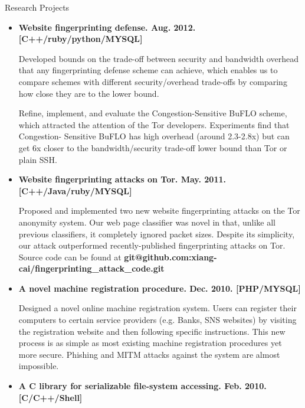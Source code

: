 \documentclass[11pt,oneside]{article}
\newenvironment{ressection}[1]{
	\vspace{4pt}
	{\fontfamily{phv}\selectfont\Large#1}
	\begin{itemize}
	\vspace{3pt}
}{
	\end{itemize}
}
\newcommand{\resitem}[1]{
	\vspace{-4pt}
	\item \begin{flushleft} #1 \end{flushleft}
}
\begin{document}
\begin{ressection}{Research Projects}

	\resitem{\textbf{Website fingerprinting defense. Aug.
		2012. [C++/ruby/python/MYSQL]} 
		\begin{small}
		
		Developed bounds on the trade-off between security and
		bandwidth overhead that any fingerprinting defense scheme can
		achieve, which enables us to compare schemes with different
		security/overhead trade-offs by comparing how close they are
		to the lower bound. 
		
		Refine, implement, and evaluate
		the Congestion-Sensitive BuFLO scheme, which attracted the attention of the
		Tor developers. Experiments find that Congestion-
		Sensitive BuFLO has high overhead (around 2.3-2.8x) but can
		get 6x closer to the bandwidth/security trade-off lower bound
		than Tor or plain SSH.
		\end{small}				
	}

	\resitem{\textbf{Website fingerprinting attacks on Tor. May.
		2011. [C++/Java/ruby/MYSQL]} 
		\begin{small}
		
		Proposed and implemented two new website fingerprinting
			attacks on the Tor anonymity system. Our web page
			classifier was novel in that, unlike all previous
			classifiers, it completely ignored packet sizes. Despite
			its simplicity, our attack outperformed 
			recently-published fingerprinting attacks on Tor. Source code can be found at \textbf{git@github.com:xiang-cai/fingerprinting\_attack\_code.git}
		\end{small}				
	}

	\resitem{\textbf{A novel machine registration procedure. Dec.
		2010. [PHP/MYSQL]}
		\begin{small}
		
		Designed a novel online machine
			registration system. Users can register their computers to
			certain service providers (e.g. Banks, SNS websites) by
			visiting the registration website and then following specific
			instructions. This new process is as simple as most existing
			machine registration procedures yet more secure. Phishing and MITM attacks against the
			system are almost impossible.
		\end{small}	
	}
			
	\resitem{\textbf{A C library for serializable file-system
				accessing. Feb. 2010. [C/C++/Shell]} 
		\begin{small}
		

\end{small}}
\end{ressection}
\end{document}
